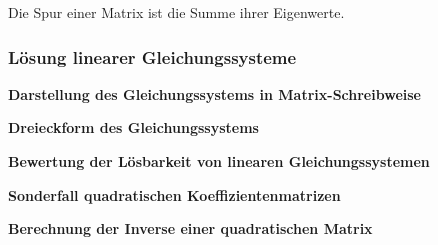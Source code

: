 \noindent Die Spur einer Matrix ist die Summe ihrer Eigenwerte. 

\subsubsection{L\"{o}sung linearer Gleichungssysteme}

\selectfont
\noindent\textbf{Darstellung des Gleichungssystems in Matrix-Schreibweise}\smallskip


\selectfont
\noindent\textbf{Dreieckform des Gleichungssystems}\smallskip


\selectfont
\noindent\textbf{Bewertung der L\"{o}sbarkeit von linearen Gleichungssystemen}\smallskip


\selectfont
\noindent\textbf{Sonderfall quadratischen Koeffizientenmatrizen}\smallskip


\selectfont
\noindent\textbf{Berechnung der Inverse einer quadratischen Matrix}\smallskip

